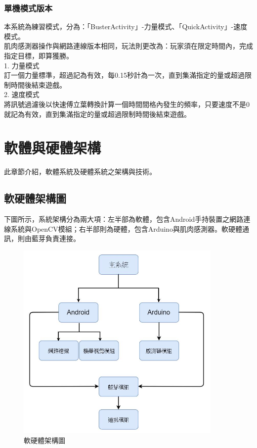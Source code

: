 \documentclass[12pt]{article}  %
\theoremstyle{plain}
\begin{document}
\subsubsection{單機模式版本}
本系統為練習模式，分為：「BusterActivity」-力量模式、「QuickActivity」-速度模式。\\
\indent 肌肉感測器操作與網路連線版本相同，玩法則更改為：玩家須在限定時間內，完成指定目標，即算獲勝。\\
1. 力量模式 \\
\indent 訂一個力量標準，超過記為有效，每0.15秒計為一次，直到集滿指定的量或超過限制時間後結束遊戲。\\
2. 速度模式 \\
\indent 將訊號過濾後以快速傅立葉轉換計算一個時間間格內發生的頻率，只要速度不是0就記為有效，直到集滿指定的量或超過限制時間後結束遊戲。\\
\newpage

\section{軟體與硬體架構}
此章節介紹，軟體系統及硬體系統之架構與技術。

\subsection{軟硬體架構圖}
下圖所示，系統架構分為兩大項：左半部為軟體，包含Android手持裝置之網路連線系統與OpenCV模組；右半部則為硬體，包含Arduino與肌肉感測器。軟硬體通訊，則由藍芽負責連接。
\begin{figure}[h]  %
\centering
\includegraphics[width=10cm]{pic/ch2/軟硬體架構圖.JPG}
\caption{軟硬體架構圖}
\end{figure}
\newpage
\end{document}
